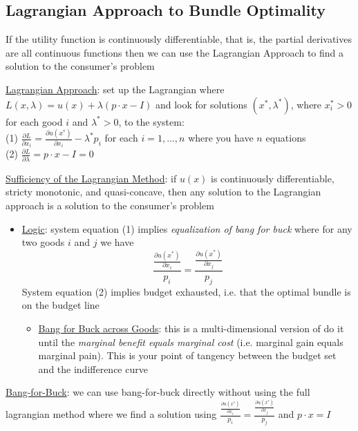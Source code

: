 \documentclass{article}
\begin{document}
\subsection{Lagrangian Approach to Bundle Optimality}
If the utility function is continuously differentiable, that is, the partial derivatives are all continuous functions then we can use the Lagrangian Approach to find a solution to the consumer's problem \par \vspace{0.3em}
  \underline{Lagrangian Approach}: set up the Lagrangian where $L(x, \lambda) = u(x) + \lambda (p \cdot x - I)$ and look for solutions $(x^{*}, \lambda^{*})$, where $x_{i}^{*} > 0$ for each good $i$ and $\lambda^{*} > 0$, to the system: \\
  \null\quad (1) $\tfrac{\partial L}{\partial x_{i}} = \tfrac{\partial u(x^{*})}{\partial x_{i}} - \lambda^{*}p_{i}$ \quad for each $i = 1, \dots, n$ where you have $n$ equations \\
  \null\quad (2) $\tfrac{\partial L}{\partial \lambda} = p \cdot x - I = 0$
  \par
  \underline{Sufficiency of the Lagrangian Method}: if $u(x)$ is continuously differentiable, stricty monotonic, and quasi-concave, then any solution to the Lagrangian approach is a solution to the consumer's problem
  \begin{itemize}
    \item  \underline{Logic}: system equation (1) implies \textit{equalization of bang for buck} where for any two goods $i$ and $j$ we have $$\frac{\tfrac{\partial u(x^{*})}{\partial x_{i}}}{p_{i}} = \frac{\tfrac{\partial u(x^{*})}{\partial x_{j}}}{p_{j}}$$ System equation (2) implies budget exhausted, i.e. that the optimal bundle is on the budget line
    \begin{itemize}
      \item  \underline{Bang for Buck across Goods}: this is a multi-dimensional version of do it until the \textit{marginal benefit equals marginal cost} (i.e. marginal gain equals marginal pain). This is your point of tangency between the budget set and the indifference curve
    \end{itemize}
  \end{itemize}
  \par
  \underline{Bang-for-Buck}: we can use bang-for-buck directly without using the full lagrangian method where we find a solution using $\frac{\tfrac{\partial u(x^{*})}{\partial x_{i}}}{p_{i}} = \frac{\tfrac{\partial u(x^{*})}{\partial x_{j}}}{p_{j}}$ and $p \cdot x = I$
\end{document}
